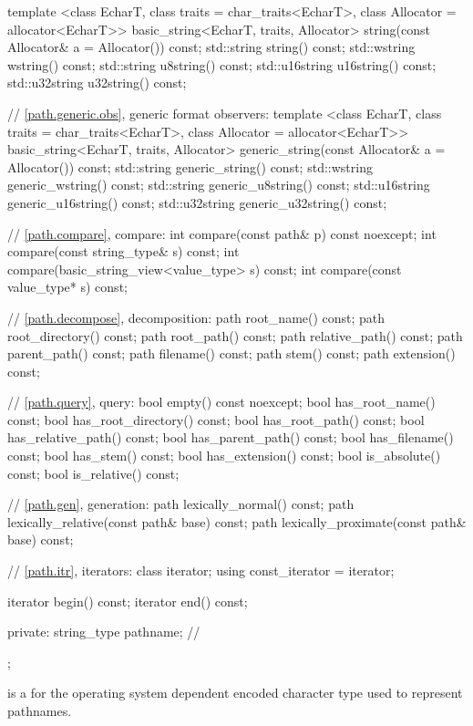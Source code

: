 \begin{codeblock}
{{    template <class EcharT, class traits = char_traits<EcharT>,
              class Allocator = allocator<EcharT>>
      basic_string<EcharT, traits, Allocator>
        string(const Allocator& a = Allocator()) const;
    std::string    string() const;
    std::wstring   wstring() const;
    std::string    u8string() const;
    std::u16string u16string() const;
    std::u32string u32string() const;

    // \ref{path.generic.obs}, generic format observers:
    template <class EcharT, class traits = char_traits<EcharT>,
              class Allocator = allocator<EcharT>>
      basic_string<EcharT, traits, Allocator>
        generic_string(const Allocator& a = Allocator()) const;
    std::string    generic_string() const;
    std::wstring   generic_wstring() const;
    std::string    generic_u8string() const;
    std::u16string generic_u16string() const;
    std::u32string generic_u32string() const;

    // \ref{path.compare}, compare:
    int  compare(const path& p) const noexcept;
    int  compare(const string_type& s) const;
    int  compare(basic_string_view<value_type> s) const;
    int  compare(const value_type* s) const;

    // \ref{path.decompose}, decomposition:
    path root_name() const;
    path root_directory() const;
    path root_path() const;
    path relative_path() const;
    path parent_path() const;
    path filename() const;
    path stem() const;
    path extension() const;

    // \ref{path.query}, query:
    bool empty() const noexcept;
    bool has_root_name() const;
    bool has_root_directory() const;
    bool has_root_path() const;
    bool has_relative_path() const;
    bool has_parent_path() const;
    bool has_filename() const;
    bool has_stem() const;
    bool has_extension() const;
    bool is_absolute() const;
    bool is_relative() const;

    // \ref{path.gen}, generation:
    path lexically_normal() const;
    path lexically_relative(const path& base) const;
    path lexically_proximate(const path& base) const;

    // \ref{path.itr}, iterators:
    class iterator;
    using const_iterator = iterator;

    iterator begin() const;
    iterator end() const;

  private:
    string_type pathname; // \expos
  };
}
\end{codeblock}

%
\pnum
{} is a  for the
operating system dependent encoded character type used to represent pathnames.

